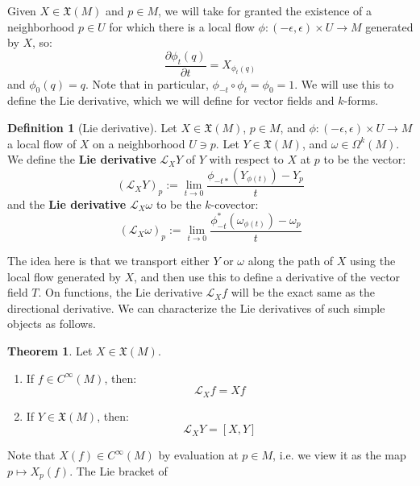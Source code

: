 \documentclass[11pt, oneside]{article}   	%
\theoremstyle{definition}
\newtheorem{definition}{Definition}[section]
\newtheorem{theorem}{Theorem}[section]
\begin{document}
Given $X\in\mathfrak X(M)$ and $p\in M$, we will take for granted the existence of a neighborhood $p\in U$ for which there is 
a local flow $\phi : (-\epsilon, \epsilon)\times U\rightarrow M$ generated by $X$, so:
\begin{equation}
	\frac{\partial\phi_t(q)}{\partial t} = X_{\phi_t(q)}
\end{equation}
and $\phi_0(q) = q$. Note that in particular, $\phi_{-t}\circ\phi_t = \phi_0 = 1$. We will use this to define the Lie derivative, 
which we will define for vector fields and $k$-forms. 
\begin{definition}[Lie derivative]
	Let $X\in\mathfrak X(M)$, $p\in M$, and $\phi : (-\epsilon, \epsilon)\times U\rightarrow M$ a local flow of $X$ on a 
	neighborhood $U\ni p$. 
	Let $Y\in\mathfrak X(M)$, and $\omega\in\Omega^k(M)$. We define the \textbf{Lie derivative} $\mathcal L_X Y$ of $Y$ 
	with respect to $X$ at $p$ to be the vector:
	\begin{equation}
		(\mathcal L_X Y)_p :=\lim_{t\rightarrow 0}\frac{\phi_{-t*}(Y_{\phi(t)}) - Y_p}{t}
	\end{equation}
	and the \textbf{Lie derivative} $\mathcal L_X\omega$ to be the $k$-covector:
	\begin{equation}
		(\mathcal L_X\omega)_p := \lim_{t\rightarrow 0}\frac{\phi_{-t}^* (\omega_{\phi(t)}) - \omega_{p}}{t}
	\end{equation}
\end{definition}
The idea here is that we transport either $Y$ or $\omega$ along the path of $X$ using the local flow generated by $X$, 
and then use this to define a derivative of the vector field $T$. On functions, the Lie derivative $\mathcal L_X f$ will be the 
exact same as the directional derivative. We can characterize the Lie derivatives of such simple objects as follows.
\begin{theorem}
	Let $X\in\mathfrak X(M)$. 
	\begin{enumerate}
		\item If $f\in C^\infty(M)$, then:
		\begin{equation}
			\mathcal L_X f = Xf
		\end{equation}
		\item If $Y\in\mathfrak X(M)$, then:
		\begin{equation}
			\mathcal L_X Y = [X, Y]
		\end{equation}
	\end{enumerate}
\end{theorem}
Note that $X(f)\in C^\infty(M)$ by evaluation at $p\in M$, i.e. we view it as the map $p\mapsto X_p(f)$. The Lie bracket of 
\end{document}
